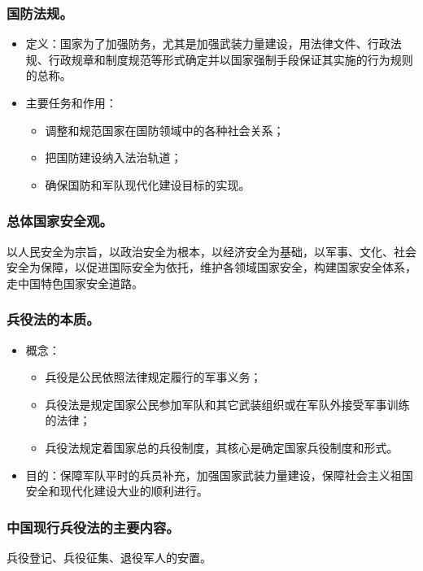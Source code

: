 \documentclass{article}
\begin{document}
\subsubsection{国防法规。}
\begin{itemize}
    \item 定义：国家为了加强防务，尤其是加强武装力量建设，用法律文件、行政法规、行政规章和制度规范等形式确定并以国家强制手段保证其实施的行为规则的总称。
    \item 主要任务和作用：
    \begin{itemize}
        \item 调整和规范国家在国防领域中的各种社会关系；
        \item 把国防建设纳入法治轨道；
        \item 确保国防和军队现代化建设目标的实现。
    \end{itemize}
\end{itemize}
    
\subsubsection{总体国家安全观。}
以人民安全为宗旨，以政治安全为根本，以经济安全为基础，以军事、文化、社会安全为保障，以促进国际安全为依托，维护各领域国家安全，构建国家安全体系，走中国特色国家安全道路。

\subsubsection{兵役法的本质。}
\begin{itemize}
    \item 概念：
    \begin{itemize}
        \item 兵役是公民依照法律规定履行的军事义务；
        \item 兵役法是规定国家公民参加军队和其它武装组织或在军队外接受军事训练的法律；
        \item 兵役法规定着国家总的兵役制度，其核心是确定国家兵役制度和形式。
    \end{itemize}
    \item 目的：保障军队平时的兵员补充，加强国家武装力量建设，保障社会主义祖国安全和现代化建设大业的顺利进行。
\end{itemize}
    
\subsubsection{中国现行兵役法的主要内容。}
兵役登记、兵役征集、退役军人的安置。
    
\end{document}
